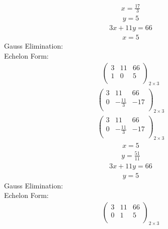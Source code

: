 \documentclass{article}
\begin{document}
\begin{align*}
x=\frac{17}{3}\end{align*}
\begin{align*}
y=5\end{align*}
\begin{align*}
3x + 11y=66\end{align*}
\begin{align*}
x=5\end{align*}
Gauss Elimination:\\
Echelon Form:\\
\begin{align*}
\left(
\begin{array}{cc|c}
3 & 11 & 66\\
1 & 0 & 5\\
\end{array}
\right)_{2\times 3}
\end{align*}
\begin{align*}
\left(
\begin{array}{cc|c}
3 & 11 & 66\\
0 & -\frac{11}{3} & -17\\
\end{array}
\right)_{2\times 3}
\end{align*}
\begin{align*}
\left(
\begin{array}{cc|c}
3 & 11 & 66\\
0 & -\frac{11}{3} & -17\\
\end{array}
\right)_{2\times 3}
\end{align*}
\begin{align*}
x=5\end{align*}
\begin{align*}
y=\frac{51}{11}\end{align*}
\begin{align*}
3x + 11y=66\end{align*}
\begin{align*}
y=5\end{align*}
Gauss Elimination:\\
Echelon Form:\\
\begin{align*}
\left(
\begin{array}{cc|c}
3 & 11 & 66\\
0 & 1 & 5\\
\end{array}
\right)_{2\times 3}
\end{align*}
\end{document}
